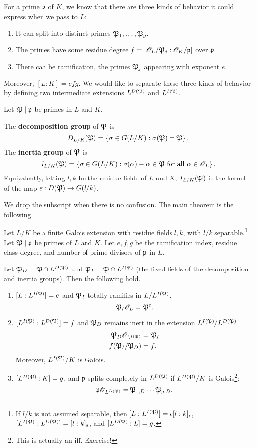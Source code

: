 For a prime $\mathfrak{p}$ of $K$, we know that there are three kinds of behavior it could express when we pass to $L$:
\begin{enumerate}
\item It can split into distinct primes $\mathfrak{P}_1,\ldots, \mathfrak{P}_g$.
\item The primes have some residue degree $f=[\mathscr{O}_L/\mathfrak{P}_j:\mathscr{O}_K/\mathfrak{p}]$ over $\mathfrak{p}$.
\item There can be ramification, the primes $\mathfrak{P}_j$ appearing with exponent $e$.
\end{enumerate}
Moreover, $[L:K]=efg$. We would like to separate these three kinds of behavior 
by defining two intermediate extensions $L^{D(\mathfrak{P})}$ and $L^{I(\mathfrak{P})}$.
\begin{df}
Let $\mathfrak{P}\mid \mathfrak{p}$ be primes in $L$ and $K$.

The \textbf{decomposition group} of $\mathfrak{P}$ is
\[
D_{L/K}(\mathfrak{P})=\left\{{\sigma\in G(L/K)}:{\sigma(\mathfrak{P})=\mathfrak{P}}\right\}.
\]
The \textbf{inertia group} of $\mathfrak{P}$ is
\[
I_{L/K}(\mathfrak{P})=\left\{{\sigma\in G(L/K)}:{\sigma(\alpha)-\alpha\in \mathfrak{P}\text{ for all }\alpha\in \mathscr{O}_L}\right\}.
\]
Equivalently, letting $l,k$ be the residue fields of $L$ and $K$, $I_{L/K}(\mathfrak{P})$ is the kernel of the map $\varepsilon:D(\mathfrak{P})\to G(l/k)$.
\end{df}
We drop the subscript when there is no confusion. 
The main theorem is the following.
\begin{thm}
Let $L/K$ be a finite Galois extension with residue fields $l,k$, with $l/k$ separable.\footnote{If $l/k$ is not assumed separable, then $[L:L^{I(\mathfrak{P})}]=e[l:k]_i$, $[L^{I(\mathfrak{P})}:L^{D(\mathfrak{P})}]=[l:k]_s$, and $[L^{D(\mathfrak{P})}:L]=g$.} Let $\mathfrak{P}\mid \mathfrak{p}$ be primes of $L$ and $K$. Let $e,f,g$ be the ramification index, residue class degree, and number of prime divisors of $\mathfrak{p}$ in $L$.

Let $\mathfrak{P}_D=\mathfrak{P}\cap L^{D(\mathfrak{P})}$ and $\mathfrak{P}_I=\mathfrak{P}\cap L^{I(\mathfrak{P})}$ (the fixed fields of the decomposition and inertia groups). Then the following hold.
\begin{enumerate}
\item $[L:L^{I(\mathfrak{P})}]=e$ and $\mathfrak{P}_I$ totally ramifies in $L/L^{I(\mathfrak{P})}$.
\[
\mathfrak{P}_I\mathscr{O}_L=\mathfrak{P}^e.
\]
\item $[L^{I(\mathfrak{P})}:L^{D(\mathfrak{P})}]=f$ and $\mathfrak{P}_D$ remains inert in the extension $L^{I(\mathfrak{P})}/L^{D(\mathfrak{P})}$.
\begin{align*}
\mathfrak{P}_D\mathscr{O}_{L^{I(\mathfrak{P})}}&=\mathfrak{P}_I\\
f(\mathfrak{P}_I/\mathfrak{P}_D)&=f.
\end{align*}
Moreover, $L^{I(\mathfrak{P})}/K$ is Galois.
\item $[L^{D(\mathfrak{P})}:K]=g$, and $\mathfrak{p}$ splits completely in $L^{D(\mathfrak{P})}$ if $L^{D(\mathfrak{P})}/K$ is Galois\footnote{This is actually an iff. Exercise!}:
\[
\mathfrak{p}\mathscr{O}_{L^{D(\mathfrak{P})}}=\mathfrak{P}_{1,D}\cdots \mathfrak{P}_{g,D}.
\]
\end{enumerate}
\end{thm}
